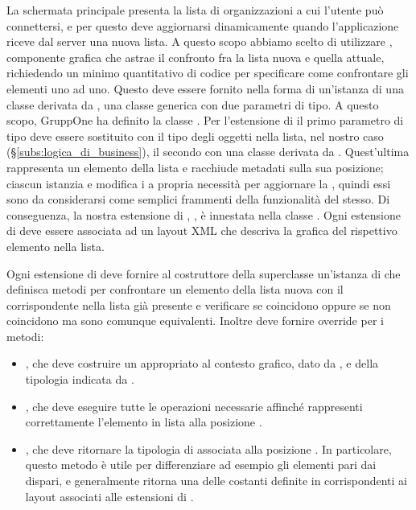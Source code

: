 \documentclass[../../manuale-manutentore.tex]{subfiles}
\begin{document}
La schermata principale presenta la lista di organizzazioni a cui l'utente può connettersi, e per questo deve aggiornarsi dinamicamente quando l'applicazione riceve dal server una nuova lista.
A questo scopo abbiamo scelto di utilizzare , componente grafica che astrae il confronto fra la lista nuova e quella attuale, richiedendo un minimo quantitativo di codice per specificare come confrontare gli elementi uno ad uno.
Questo deve essere fornito nella forma di un'istanza di una classe derivata da , una classe generica con due parametri di tipo.
A questo scopo, GruppOne ha definito la classe .
Per l'estensione di  il primo parametro di tipo deve essere sostituito con il tipo degli oggetti nella lista, nel nostro caso  (§\ref{subs:logica_di_business}), il secondo con una classe derivata da .
Quest'ultima rappresenta un elemento della lista e racchiude metadati sulla sua posizione; ciascun  istanzia e modifica i  a propria necessità per aggiornare la , quindi essi sono da considerarsi come semplici frammenti della funzionalità del  stesso.
Di conseguenza, la nostra estensione di , , è innestata nella classe . Ogni estensione di  deve essere associata ad un layout XML che descriva la grafica del rispettivo elemento nella lista.\par

Ogni estensione di  deve fornire al costruttore della superclasse un'istanza di \linebreak{} che definisca metodi per confrontare un elemento della lista nuova con il corrispondente nella lista già presente e verificare se coincidono oppure se non coincidono ma sono comunque equivalenti. Inoltre deve fornire override per i metodi:
\begin{itemize}
  \item{}, che deve costruire un  appropriato al contesto grafico, dato da , e della tipologia indicata da .
  \item{}, che deve eseguire tutte le operazioni necessarie affinché  rappresenti correttamente l'elemento in lista alla posizione .
  \item{}, che deve ritornare la tipologia di  associata alla posizione  . In particolare, questo metodo è utile per differenziare ad esempio gli elementi pari dai dispari, e generalmente ritorna una delle costanti definite in  corrispondenti ai layout associati alle estensioni di .
\end{itemize}
\end{document}
